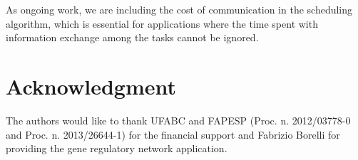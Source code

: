 \documentclass[journal]{IEEEtran}
\begin{document}
As ongoing work, we are including the cost of communication in the scheduling
algorithm, which is essential for applications where the time spent with
information exchange among the tasks cannot be ignored.

\section*{Acknowledgment}

The authors would like to thank UFABC and FAPESP (Proc. n. 2012/03778-0 and
Proc. n.  2013/26644-1) for the financial support and Fabrizio Borelli for
providing the gene regulatory network application.

\ifCLASSOPTIONcaptionsoff
  \newpage
\fi



%
%

\end{document}

